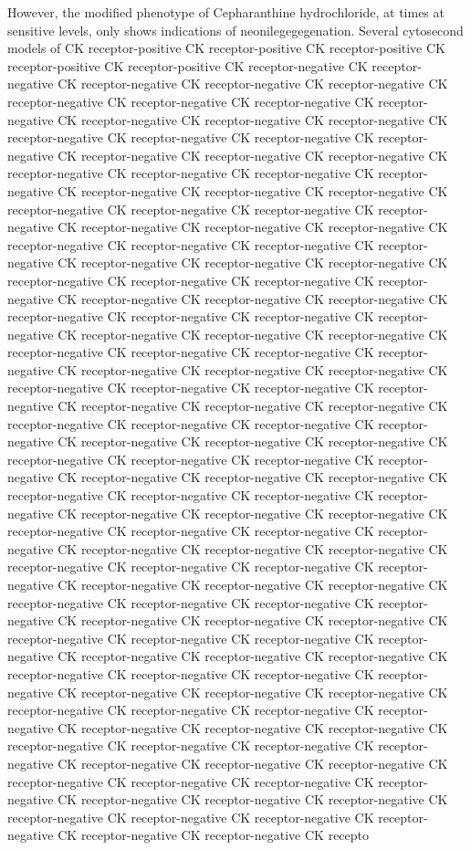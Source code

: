 \documentclass{article}
\begin{document}
However, the modified phenotype of Cepharanthine hydrochloride, at times at sensitive levels, only shows indications of neonilegegegenation. Several cytosecond models of CK receptor-positive CK receptor-positive CK receptor-positive CK receptor-positive CK receptor-positive CK receptor-negative CK receptor-negative CK receptor-negative CK receptor-negative CK receptor-negative CK receptor-negative CK receptor-negative CK receptor-negative CK receptor-negative CK receptor-negative CK receptor-negative CK receptor-negative CK receptor-negative CK receptor-negative CK receptor-negative CK receptor-negative CK receptor-negative CK receptor-negative CK receptor-negative CK receptor-negative CK receptor-negative CK receptor-negative CK receptor-negative CK receptor-negative CK receptor-negative CK receptor-negative CK receptor-negative CK receptor-negative CK receptor-negative CK receptor-negative CK receptor-negative CK receptor-negative CK receptor-negative CK receptor-negative CK receptor-negative CK receptor-negative CK receptor-negative CK receptor-negative CK receptor-negative CK receptor-negative CK receptor-negative CK receptor-negative CK receptor-negative CK receptor-negative CK receptor-negative CK receptor-negative CK receptor-negative CK receptor-negative CK receptor-negative CK receptor-negative CK receptor-negative CK receptor-negative CK receptor-negative CK receptor-negative CK receptor-negative CK receptor-negative CK receptor-negative CK receptor-negative CK receptor-negative CK receptor-negative CK receptor-negative CK receptor-negative CK receptor-negative CK receptor-negative CK receptor-negative CK receptor-negative CK receptor-negative CK receptor-negative CK receptor-negative CK receptor-negative CK receptor-negative CK receptor-negative CK receptor-negative CK receptor-negative CK receptor-negative CK receptor-negative CK receptor-negative CK receptor-negative CK receptor-negative CK receptor-negative CK receptor-negative CK receptor-negative CK receptor-negative CK receptor-negative CK receptor-negative CK receptor-negative CK receptor-negative CK receptor-negative CK receptor-negative CK receptor-negative CK receptor-negative CK receptor-negative CK receptor-negative CK receptor-negative CK receptor-negative CK receptor-negative CK receptor-negative CK receptor-negative CK receptor-negative CK receptor-negative CK receptor-negative CK receptor-negative CK receptor-negative CK receptor-negative CK receptor-negative CK receptor-negative CK receptor-negative CK receptor-negative CK receptor-negative CK receptor-negative CK receptor-negative CK receptor-negative CK receptor-negative CK receptor-negative CK receptor-negative CK receptor-negative CK receptor-negative CK receptor-negative CK receptor-negative CK receptor-negative CK receptor-negative CK receptor-negative CK receptor-negative CK receptor-negative CK receptor-negative CK receptor-negative CK receptor-negative CK receptor-negative CK receptor-negative CK receptor-negative CK receptor-negative CK receptor-negative CK receptor-negative CK receptor-negative CK receptor-negative CK receptor-negative CK receptor-negative CK receptor-negative CK receptor-negative CK receptor-negative CK receptor-negative CK receptor-negative CK receptor-negative CK receptor-negative CK receptor-negative CK receptor-negative CK receptor-negative CK receptor-negative CK receptor-negative CK receptor-negative CK receptor-negative CK recepto
\end{document}
